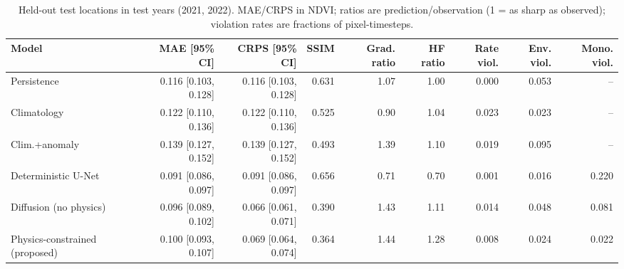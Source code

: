 \begin{table}[t]
\centering
\caption{Held-out test locations in test years (2021, 2022). MAE/CRPS in NDVI; ratios are prediction/observation (1 = as sharp as observed); violation rates are fractions of pixel-timesteps.}
\label{tab:main}
\scriptsize
\begin{tabular}{lrrrrrrrr}
\hline
Model & MAE [95\% CI] & CRPS [95\% CI] & SSIM & Grad. ratio & HF ratio & Rate viol. & Env. viol. & Mono. viol. \\
\hline
Persistence & 0.116 [0.103, 0.128] & 0.116 [0.103, 0.128] & 0.631 & 1.07 & 1.00 & 0.000 & 0.053 & -- \\
Climatology & 0.122 [0.110, 0.136] & 0.122 [0.110, 0.136] & 0.525 & 0.90 & 1.04 & 0.023 & 0.023 & -- \\
Clim.+anomaly & 0.139 [0.127, 0.152] & 0.139 [0.127, 0.152] & 0.493 & 1.39 & 1.10 & 0.019 & 0.095 & -- \\
Deterministic U-Net & 0.091 [0.086, 0.097] & 0.091 [0.086, 0.097] & 0.656 & 0.71 & 0.70 & 0.001 & 0.016 & 0.220 \\
Diffusion (no physics) & 0.096 [0.089, 0.102] & 0.066 [0.061, 0.071] & 0.390 & 1.43 & 1.11 & 0.014 & 0.048 & 0.081 \\
Physics-constrained (proposed) & 0.100 [0.093, 0.107] & 0.069 [0.064, 0.074] & 0.364 & 1.44 & 1.28 & 0.008 & 0.024 & 0.022 \\
\hline
\end{tabular}
\end{table}
